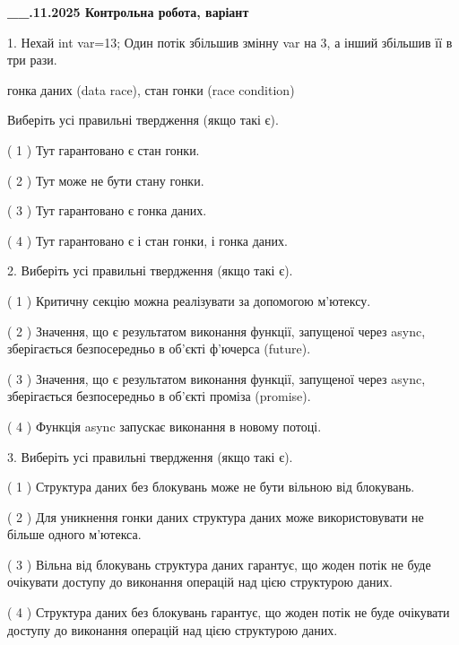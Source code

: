 \documentclass[12pt, ukrainian]{article}
\begin{document}
\newpage
\begin {large}

\textbf{\_\_.11.2025 Контрольна робота, варіант  }\par


{
1. Нехай int var=13; Один потік збільшив змінну var на 3, а інший збільшив її в три рази.

гонка даних (data race), стан гонки (race condition)

Виберіть усі правильні твердження (якщо такі є).\par
\vspace{2mm}
( 1 ) Тут гарантовано є стан гонки.%

( 2 ) Тут може не бути стану гонки.%

( 3 ) Тут гарантовано є гонка даних.%

( 4 ) Тут гарантовано є і стан гонки, і гонка даних.%


2. Виберіть усі правильні твердження (якщо такі є).\par
\vspace{2mm}

( 1 ) Критичну секцію можна реалізувати за допомогою м’ютексу.%

( 2 ) Значення, що є результатом виконання функції, запущеної через async, зберігається безпосередньо в об’єкті ф’ючерса (future).%

( 3 ) Значення, що є результатом виконання функції, запущеної через async, зберігається безпосередньо в об’єкті проміза (promise).%

( 4 ) Функція async запускає виконання в новому потоці.%


3. Виберіть усі правильні твердження (якщо такі є).\par
\vspace{2mm}

( 1 ) Структура даних без блокувань може не бути вільною від блокувань.%

( 2 ) Для уникнення гонки даних структура даних може використовувати не більше одного м’ютекса.%

( 3 ) Вільна від блокувань структура даних гарантує, що жоден потік не буде очікувати доступу до виконання операцій над цією структурою даних.%

( 4 ) Структура даних без блокувань гарантує, що жоден потік не буде очікувати доступу до виконання операцій над цією структурою даних.%


}
\end{large}
\end{document}
